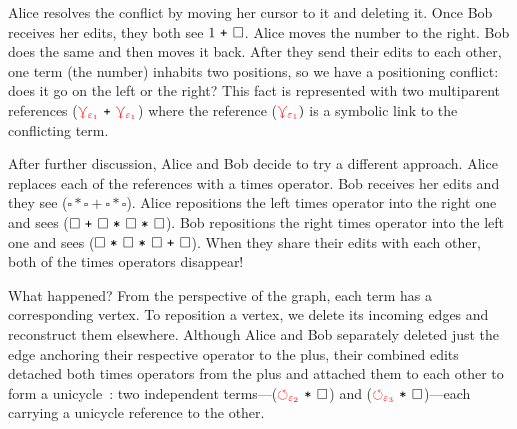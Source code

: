 \documentclass[nonacm, acmsmall, screen, review]{acmart}
\newcommand{\e}{\varepsilon}
\newcommand{\id}[1]{\textcolor{gray}{\ensuremath{#1}}}
\newcommand{\eid}[2]{{#2}^{\id{#1}}}
\newcommand{\hole}{\ensuremath{\square}} %
\newcommand{\ePlus}[3]{#2~\eid{#1}{\texttt{+}}~#3}
\newcommand{\eTimes}[3]{#2~\eid{#1}{\texttt{*}}~#3}
\newcommand{\multiVertex}[1]{\textcolor{red}{\ensuremath{\curlyveedownarrow_{#1}}}}
\newcommand{\cycleVertex}[1]{\textcolor{red}{\ensuremath{\circlearrowleft_{#1}}}}
\begin{document}

Alice resolves the conflict by moving her cursor to it and deleting it.
Once Bob receives her edits, they both see $\ePlus{}{1}{\hole}$.
Alice moves the number to the right.
Bob does the same and then moves it back.
After they send their edits to each other, one term (the number) inhabits two positions, so we have a positioning conflict:
does it go on the left or the right?
This fact is represented with two multiparent references ($\ePlus{}{\multiVertex{\e_1}}{\multiVertex{\e_1}}$) where the reference ($\multiVertex{\e_1})$ is a symbolic link to the conflicting term.

After further discussion, Alice and Bob decide to try a different approach.
Alice replaces each of the references with a times operator.
Bob receives her edits and they see ($\hole * \hole + \hole * \hole$).
Alice repositions the left times operator into the right one and sees ($\ePlus{}{\hole}{\eTimes{}{\eTimes{}{\hole}{\hole}}{\hole}}$).
Bob repositions the right times operator into the left one and sees ($\ePlus{}{\eTimes{}{\hole}{\eTimes{}{\hole}{\hole}}}{\hole}$).
When they share their edits with each other, both of the times operators disappear!

What happened?
From the perspective of the graph, each term has a corresponding vertex.
To reposition a vertex, we delete its incoming edges and reconstruct them elsewhere.
Although Alice and Bob separately deleted just the edge anchoring their respective operator to the plus,
their combined edits detached both times operators from the plus and attached them to each other to
form a unicycle~\cite{kruskal_efficient_1990}:
two independent terms---($\eTimes{}{\cycleVertex{\e_2}}{\hole}$) and ($\eTimes{}{\cycleVertex{\e_3}}{\hole}$)---each carrying a unicycle reference to the other.
\end{document}

